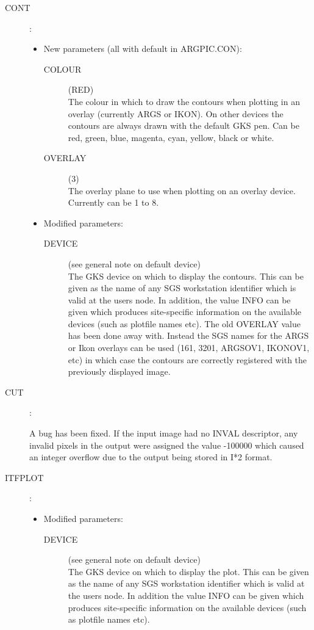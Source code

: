 \begin{description}
\item [CONT]:

\begin{itemize}
\item New parameters (all with default in ARGPIC.CON):
\begin{description}
\item [COLOUR](RED)\\
 The colour in which to draw the contours when plotting in an overlay
 (currently ARGS or IKON).
 On other devices the contours are always drawn with the default GKS pen.
 Can be red, green, blue, magenta, cyan, yellow, black or white.
\item [OVERLAY](3)\\
 The overlay plane to use when plotting on an overlay device.
 Currently can be 1 to 8.
\end{description}
\item Modified parameters:
\begin{description}
\item [DEVICE](see general note on default device)\\
 The GKS device on which to display the contours.
 This can be given as the name of any SGS workstation identifier which is valid
 at the users node.
 In addition, the value INFO can be given which produces site-specific
 information on the available devices (such as plotfile names etc).
 The old OVERLAY value has been done away with.
 Instead the SGS names for the ARGS or Ikon overlays can be used (161, 3201,
 ARGSOV1, IKONOV1, etc) in which case the contours are correctly registered
 with the previously displayed image.
\end{description}
\end{itemize}

\item [CUT]:

A bug has been fixed.
If the input image had no INVAL descriptor, any invalid pixels in the output
were assigned the value -100000 which caused an integer overflow due to the
output being stored in I*2 format.

\item [ITFPLOT]:

\begin{itemize}
\item Modified parameters:
\begin{description}
\item [DEVICE](see general note on default device)\\
 The GKS device on which to display the plot.
 This can be given as the name of any SGS workstation identifier which is valid
 at the users node.
 In addition the value INFO can be given which produces site-specific
 information on the available devices (such as plotfile names etc).
\end{description}
\end{itemize}


\end{description}
